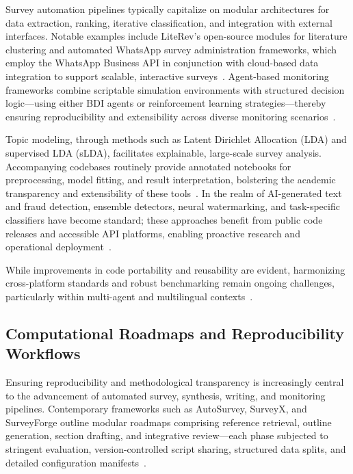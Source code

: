 Survey automation pipelines typically capitalize on modular architectures for data extraction, ranking, iterative classification, and integration with external interfaces. Notable examples include LiteRev’s open-source modules for literature clustering and automated WhatsApp survey administration frameworks, which employ the WhatsApp Business API in conjunction with cloud-based data integration to support scalable, interactive surveys~\cite{ref84}\cite{ref86}\cite{ref94}\cite{ref104}. Agent-based monitoring frameworks combine scriptable simulation environments with structured decision logic---using either BDI agents or reinforcement learning strategies---thereby ensuring reproducibility and extensibility across diverse monitoring scenarios~\cite{ref88}\cite{ref91}\cite{ref92}\cite{ref100}\cite{ref102}\cite{ref112}\cite{ref113}\cite{ref114}\cite{ref115}\cite{ref117}.

Topic modeling, through methods such as Latent Dirichlet Allocation (LDA) and supervised LDA (sLDA), facilitates explainable, large-scale survey analysis. Accompanying codebases routinely provide annotated notebooks for preprocessing, model fitting, and result interpretation, bolstering the academic transparency and extensibility of these tools~\cite{ref89}\cite{ref93}\cite{ref113}. In the realm of AI-generated text and fraud detection, ensemble detectors, neural watermarking, and task-specific classifiers have become standard; these approaches benefit from public code releases and accessible API platforms, enabling proactive research and operational deployment~\cite{ref91}\cite{ref94}\cite{ref104}\cite{ref117}.

While improvements in code portability and reusability are evident, harmonizing cross-platform standards and robust benchmarking remain ongoing challenges, particularly within multi-agent and multilingual contexts~\cite{ref92}\cite{ref102}\cite{ref113}\cite{ref115}.

\subsection{Computational Roadmaps and Reproducibility Workflows}

Ensuring reproducibility and methodological transparency is increasingly central to the advancement of automated survey, synthesis, writing, and monitoring pipelines. Contemporary frameworks such as AutoSurvey, SurveyX, and SurveyForge outline modular roadmaps comprising reference retrieval, outline generation, section drafting, and integrative review—each phase subjected to stringent evaluation, version-controlled script sharing, structured data splits, and detailed configuration manifests~\cite{ref78,ref87,ref100,ref102,ref104,ref113,ref114,ref115}.

